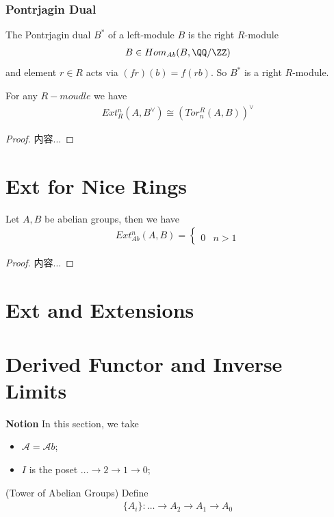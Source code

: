 \documentclass[Total.tex]{subfiles}
\begin{document}
			\subsubsection{Pontrjagin Dual}
			\begin{Def}
				The Pontrjagin dual $B^*$ of a left-module $B$ is the right $R$-module 
				\begin{gather*}
					B\in Hom_{Ab}(B,\QQ/\ZZ)
				\end{gather*}
				and element $r\in R$ acts via $(fr)(b)=f(rb)$. So $B^*$ is a right $R$-module.
			\end{Def}
			
			\begin{theorem}
				For any $R-moudle$ we have
				\begin{gather*}
					Ext^n_R(A,B^\vee)\cong (Tor_n^R(A,B))^\vee
				\end{gather*}
			\end{theorem}
			\begin{proof}
				内容...
			\end{proof}
		\section{Ext for Nice Rings}
			\begin{lemma}
				Let $A,B$ be abelian groups, then we have
				\begin{gather*}
					Ext^n_{Ab}(A,B)=\begin{cases}
						\\
						0&n>1
					\end{cases}
				\end{gather*}
			\end{lemma}
			\begin{proof}
				内容...
			\end{proof}
		\section{Ext and Extensions}
		\section{Derived Functor and Inverse Limits}
			\textbf{Notion} In this section, we take
			\begin{itemize}
				\item $\mathcal{A}={\mathcal Ab}$;
				\item $I$ is the poset $\dots\rightarrow 2\rightarrow 1\rightarrow 0$;
			\end{itemize}
			\begin{Def}
				(Tower of Abelian Groups) Define
				\begin{gather*}
					\{A_i\}:\dots\rightarrow A_2\rightarrow A_1\rightarrow A_0
				\end{gather*}
			\end{Def}
			
\end{document}
